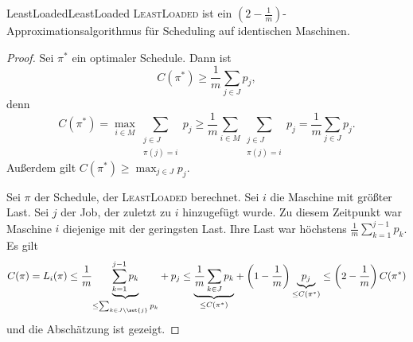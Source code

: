 \documentclass[language=ngerman,algolist]{TemplateLecture}
\begin{document}
\begin{algorithm}[H]
    \caption{\textsc{LeastLoaded}}\label{alg:leastloaded}
    \begin{algorithmic}[1]
    \end{algorithmic}
\end{algorithm}

\begin{thm}{LeastLoaded}{LeastLoaded}
    \textsc{LeastLoaded} ist ein $(2-\frac{1}{m})$-Approximationsalgorithmus für Scheduling auf identischen Maschinen.
\end{thm}

\begin{proof}
    Sei $\pi^*$ ein optimaler Schedule. Dann ist 
    \begin{equation*}
        C(\pi^*) \geq \frac{1}{m}\sum_{j \in J}  p_j,
    \end{equation*}
    denn
    \begin{equation*}
        C(\pi^*) = \max_{i \in M} \sum_{\substack{j \in J \\ \pi(j) = i}} p_j \geq \frac{1}{m}\sum_{i \in M}\sum_{\substack{j \in J \\ \pi(j) = i}} p_j = \frac{1}{m}\sum_{j \in J} p_j.
    \end{equation*}
    Außerdem gilt $C(\pi^*) \geq\displaystyle\max_{j \in J} p_j$.

    Sei $\pi$ der Schedule, der \textsc{LeastLoaded} berechnet. Sei $i$ die Maschine mit größter Last. Sei $j$ der Job, der zuletzt zu $i$ hinzugefügt wurde. Zu diesem Zeitpunkt war Maschine $i$ diejenige mit der geringsten Last. Ihre Last war höchstens $\frac{1}{m}\sum_{k = 1}^{j-1} p_k$. Es gilt 
    \begin{equation*}
        C(\pi) = L_i(\pi) \leq \frac{1}{m}\underset{\leq\sum_{k \in J \setminus \set{j}} p_k}{\underbrace{\sum_{k = 1}^{j-1} p_k}} + p_j \leq \underset{\leq C(\pi^*)}{\underbrace{\frac{1}{m} \sum_{k \in J} p_k}} + \left( 1 - \frac{1}{m} \right) \underset{\leq C(\pi^*)}{\underbrace{p_j}} \leq \left( 2 - \frac{1}{m} \right)C(\pi^*)
    \end{equation*}
    und die Abschätzung ist gezeigt.
\end{proof}
\end{document}
